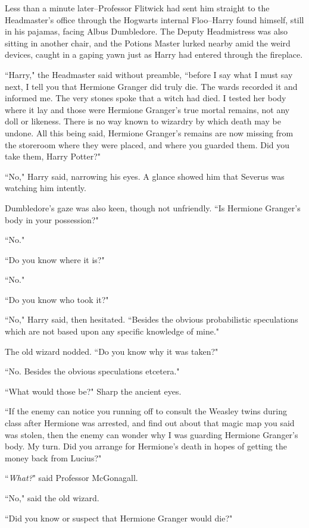 Less than a minute later\---Professor Flitwick had sent him straight to the Headmaster's office through the Hogwarts internal Floo\---Harry found himself, still in his pajamas, facing Albus Dumbledore. The Deputy Headmistress was also sitting in another chair, and the Potions Master lurked nearby amid the weird devices, caught in a gaping yawn just as Harry had entered through the fireplace.

``Harry," the Headmaster said without preamble, ``before I say what I must say next, I tell you that Hermione Granger did truly die. The wards recorded it and informed me. The very stones spoke that a witch had died. I tested her body where it lay and those were Hermione Granger's true mortal remains, not any doll or likeness. There is no way known to wizardry by which death may be undone. All this being said, Hermione Granger's remains are now missing from the storeroom where they were placed, and where you guarded them. Did you take them, Harry Potter?"

``No," Harry said, narrowing his eyes. A glance showed him that Severus was watching him intently.

Dumbledore's gaze was also keen, though not unfriendly. ``Is Hermione Granger's body in your possession?"

``No."

``Do you know where it is?"

``No."

``Do you know who took it?"

``No," Harry said, then hesitated. ``Besides the obvious probabilistic speculations which are not based upon any specific knowledge of mine."

The old wizard nodded. ``Do you know why it was taken?"

``No. Besides the obvious speculations etcetera."

``What would those be?" Sharp the ancient eyes.

``If the enemy can notice you running off to consult the Weasley twins during class after Hermione was arrested, and find out about that magic map you said was stolen, then the enemy can wonder why I was guarding Hermione Granger's body. My turn. Did you arrange for Hermione's death in hopes of getting the money back from Lucius?"

``\emph{What?}" said Professor McGonagall.

``No," said the old wizard.

``Did you know or suspect that Hermione Granger would die?"


